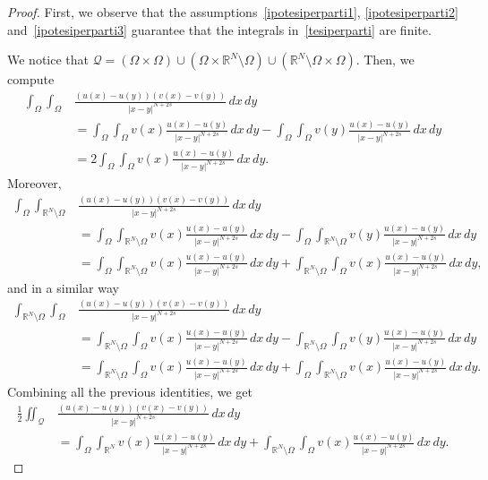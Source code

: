\documentclass[12pt,a4paper,intlimits,sumlimits]{amsart}
\def \R {\mathbb{R}}
\def \Q {\mathcal Q}
\theoremstyle{definition}
\theoremstyle{plain}
\numberwithin{equation}{section}
\begin{document}
\begin{proof}
First, we observe that the assumptions~\eqref{ipotesiperparti1},
\eqref{ipotesiperparti2} and~\eqref{ipotesiperparti3} guarantee 
that the integrals in~\eqref{tesiperparti} are finite.

We notice that 
$\Q=(\Omega\times \Omega)\cup (\Omega \times \R^N\setminus \Omega)\cup ( \R^N\setminus \Omega \times \Omega )$.
Then, we compute
\[
\begin{aligned}
\int_\Omega \int_\Omega &\frac{(u(x)-u(y))(v(x)-v(y))}{|x-y|^{N+2s}}\,dx\,dy \\
&=\int_\Omega \int_\Omega v(x)\frac{u(x)-u(y)}{|x-y|^{N+2s}}\,dx\,dy
-\int_\Omega \int_\Omega v(y)\frac{u(x)-u(y)}{|x-y|^{N+2s}}\,dx\,dy \\
&=2\int_\Omega \int_\Omega v(x)\frac{u(x)-u(y)}{|x-y|^{N+2s}}\,dx\,dy.
\end{aligned}
\]
Moreover,
\[
\begin{aligned}
\int_\Omega \int_{\R^N\setminus\Omega} &\frac{(u(x)-u(y))(v(x)-v(y))}{|x-y|^{N+2s}}\,dx\,dy \\
&=\int_\Omega \int_{\R^N\setminus\Omega} v(x)\frac{u(x)-u(y)}{|x-y|^{N+2s}}\,dx\,dy
-\int_\Omega \int_{\R^N\setminus\Omega} v(y)\frac{u(x)-u(y)}{|x-y|^{N+2s}}\,dx\,dy \\
&=\int_\Omega \int_{\R^N\setminus\Omega} v(x)\frac{u(x)-u(y)}{|x-y|^{N+2s}}\,dx\,dy
+\int_{\R^N\setminus\Omega}\int_\Omega  v(x)\frac{u(x)-u(y)}{|x-y|^{N+2s}}\,dx\,dy,
\end{aligned}
\]
and in a similar way
\[
\begin{aligned}
\int_{\R^N\setminus\Omega} \int_\Omega  &\frac{(u(x)-u(y))(v(x)-v(y))}{|x-y|^{N+2s}}\,dx\,dy \\
&=\int_{\R^N\setminus\Omega} \int_\Omega v(x)\frac{u(x)-u(y)}{|x-y|^{N+2s}}\,dx\,dy
-\int_{\R^N\setminus\Omega} \int_\Omega v(y)\frac{u(x)-u(y)}{|x-y|^{N+2s}}\,dx\,dy \\
&=\int_{\R^N\setminus\Omega} \int_\Omega v(x)\frac{u(x)-u(y)}{|x-y|^{N+2s}}\,dx\,dy
+\int_\Omega \int_{\R^N\setminus\Omega}  v(x)\frac{u(x)-u(y)}{|x-y|^{N+2s}}\,dx\,dy.
\end{aligned}
\]
Combining all the previous identities, we get
\[
\begin{aligned}
\frac{1}{2}\iint_\Q&\frac{(u(x)-u(y))(v(x)-v(y))}{|x-y|^{N+2s}}\,dx\,dy \\
&=\int_\Omega\int_{\R^N}v(x)\frac{u(x)-u(y)}{|x-y|^{N+2s}}\,dx\,dy
+\int_{\R^N\setminus\Omega} \int_\Omega v(x)\frac{u(x)-u(y)}{|x-y|^{N+2s}}\,dx\,dy.
\end{aligned}
\]
\end{proof}
\end{document}
